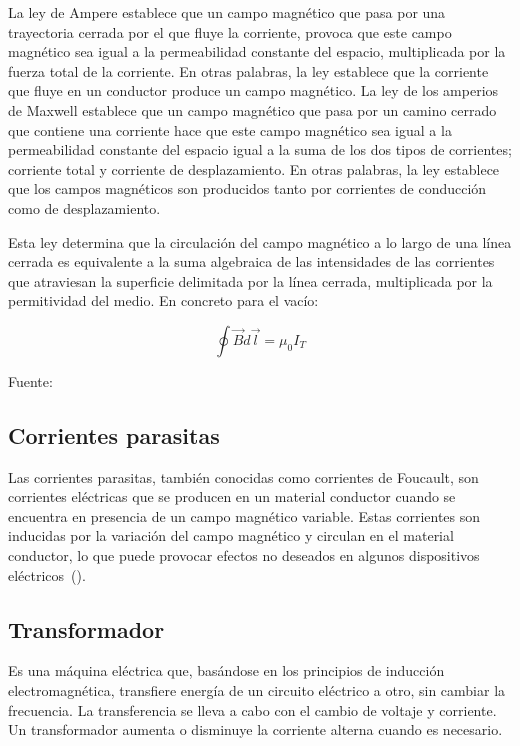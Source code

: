 \documentclass[twocolumn, 12pt]{article}
\begin{document}
La ley de Ampere establece que un campo magnético que pasa
por una trayectoria cerrada por el que fluye la corriente,
provoca que este campo magnético sea igual a la
permeabilidad constante del espacio, multiplicada por la
fuerza total de la corriente. En otras palabras, la ley
establece que la corriente que fluye en un conductor
produce un campo magnético. La ley de los amperios de
Maxwell establece que un campo magnético que pasa por un
camino cerrado que contiene una corriente hace que este
campo magnético sea igual a la permeabilidad constante del
espacio igual a la suma de los dos tipos de corrientes;
corriente total y corriente de desplazamiento. En otras
palabras, la ley establece que los campos magnéticos son
producidos tanto por corrientes de conducción como de
desplazamiento.

Esta ley determina que la circulación del campo magnético a
lo largo de una línea cerrada es equivalente a la suma
algebraica de las intensidades de las corrientes que
atraviesan la superficie delimitada por la línea cerrada,
multiplicada por la permitividad del medio. En concreto
para el vacío:

{\Large
\begin{equation}
	\oint \vec{B} d\vec{l} = \mu_0 I_T
\end{equation}
}

Fuente:~\cite{LeyesMaxwell}

\subsection*{Corrientes parasitas}

Las corrientes parasitas, también conocidas como corrientes
de Foucault, son corrientes eléctricas que se producen en
un material conductor cuando se encuentra en presencia de
un campo magnético variable. Estas corrientes son inducidas
por la variación del campo magnético y circulan en el
material conductor, lo que puede provocar efectos no
deseados en algunos dispositivos
eléctricos~(\cite{reyes_pinto_2014}).

\subsection*{Transformador}

Es una máquina eléctrica que, basándose en los principios
de inducción electromagnética, transfiere energía de un
circuito eléctrico a otro, sin cambiar la frecuencia. La
transferencia se lleva a cabo con el cambio de voltaje y
corriente. Un transformador aumenta o disminuye la
corriente alterna cuando es necesario.
\end{document}
